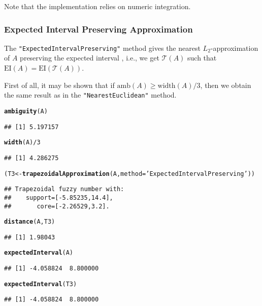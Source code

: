 \documentclass[11pt]{article}\usepackage[]{graphicx}\usepackage[]{color}
\makeatletter
\newcommand{\hlnum}[1]{\textcolor[rgb]{0.686,0.059,0.569}{#1}}%
\newcommand{\hlstr}[1]{\textcolor[rgb]{0.192,0.494,0.8}{#1}}%
\newcommand{\hlopt}[1]{\textcolor[rgb]{0,0,0}{#1}}%
\newcommand{\hlstd}[1]{\textcolor[rgb]{0.345,0.345,0.345}{#1}}%
\newcommand{\hlkwb}[1]{\textcolor[rgb]{0.69,0.353,0.396}{#1}}%
\newcommand{\hlkwc}[1]{\textcolor[rgb]{0.333,0.667,0.333}{#1}}%
\newcommand{\hlkwd}[1]{\textcolor[rgb]{0.737,0.353,0.396}{\textbf{#1}}}%
\newenvironment{kframe}{%
 \def\at@end@of@kframe{}%
 \ifinner\ifhmode%
  \def\at@end@of@kframe{\end{minipage}}%
  \begin{minipage}{\columnwidth}%
 \fi\fi%
 \def\FrameCommand##1{\hskip\@totalleftmargin \hskip-\fboxsep
 \colorbox{shadecolor}{##1}\hskip-\fboxsep
     \hskip-\linewidth \hskip-\@totalleftmargin \hskip\columnwidth}%
 \MakeFramed {\advance\hsize-\width
   \@totalleftmargin\z@ \linewidth\hsize
   \@setminipage}}%
 {\par\unskip\endMakeFramed%
 \at@end@of@kframe}
\newenvironment{knitrout}{}{} %
\newcommand{\str}[1]{\texttt{\hlstr{#1}}}
\makeatother
\begin{document}
Note that the implementation relies on numeric integration.

\subsubsection{Expected Interval Preserving Approximation}


The \str{"{}ExpectedIntervalPreserving"{}} method
gives the nearest $L_2$-approximation of $A$
preserving the expected interval \cite{Ban2008:approxpresexpint,Grzegorzewski2010:trapfnapproxexpint,Yeh2008:traptriapprox},
i.e., we get $\mathcal{T}(A)$ such that $\mathrm{EI}(A)=\mathrm{EI}(\mathcal{T}(A))$.

First of all, it may be shown that if $\mathrm{amb}(A) \ge \mathrm{width}(A)/3$, then
we obtain the same result as in
the \str{"{}NearestEuclidean"{}} method.


\begin{knitrout}\small
{}\color{fgcolor}\begin{kframe}
\begin{alltt}
\hlkwd{ambiguity}\hlstd{(A)}
\end{alltt}
\begin{verbatim}
## [1] 5.197157
\end{verbatim}
\begin{alltt}
\hlkwd{width}\hlstd{(A)}\hlopt{/}\hlnum{3}
\end{alltt}
\begin{verbatim}
## [1] 4.286275
\end{verbatim}
\begin{alltt}
\hlstd{(T3} \hlkwb{<-} \hlkwd{trapezoidalApproximation}\hlstd{(A,} \hlkwc{method}\hlstd{=}\hlstr{'ExpectedIntervalPreserving'}\hlstd{))}
\end{alltt}
\begin{verbatim}
## Trapezoidal fuzzy number with:
##    support=[-5.85235,14.4],
##       core=[-2.26529,3.2].
\end{verbatim}
\begin{alltt}
\hlkwd{distance}\hlstd{(A, T3)}
\end{alltt}
\begin{verbatim}
## [1] 1.98043
\end{verbatim}
\begin{alltt}
\hlkwd{expectedInterval}\hlstd{(A)}
\end{alltt}
\begin{verbatim}
## [1] -4.058824  8.800000
\end{verbatim}
\begin{alltt}
\hlkwd{expectedInterval}\hlstd{(T3)}
\end{alltt}
\begin{verbatim}
## [1] -4.058824  8.800000
\end{verbatim}
\end{kframe}
\end{knitrout}
\end{document}
